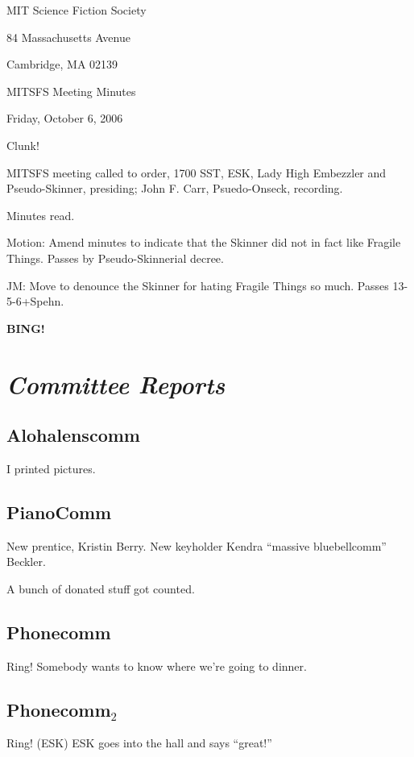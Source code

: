 \documentclass[10pt]{article}
\newcommand{\bing}{{\bf BING!} }
\newcommand{\goto}[1]{\bing \vskip 12pt \section*{{\em{#1}}}}
\begin{document}
\begin{center}

MIT Science Fiction Society

84 Massachusetts Avenue

Cambridge, MA 02139

\vspace{12pt}

MITSFS Meeting Minutes

Friday, October 6, 2006

\end{center}

\vspace{18pt}

\setlength{\parskip}{6pt}

Clunk!

\noindent
MITSFS meeting called to order, 1700 SST,
ESK, Lady High Embezzler and Pseudo-Skinner, presiding;
John F. Carr, Psuedo-Onseck, recording.

Minutes read.

Motion: Amend minutes to indicate that the Skinner did not in fact
like Fragile Things.  Passes by Pseudo-Skinnerial decree.

JM: Move to denounce the Skinner for hating Fragile Things so much.
Passes 13-5-6+Spehn.

\goto{Committee Reports}

\subsection*{Alohalenscomm}

I printed pictures.

\subsection*{PianoComm}

New prentice, Kristin Berry.  New keyholder Kendra ``massive bluebellcomm'' Beckler.

A bunch of donated stuff got counted.

\subsection*{Phonecomm}
Ring!  Somebody wants to know where we're going to dinner.

\subsection*{Phonecomm$_2$}
Ring!  (ESK)  ESK goes into the hall and says ``great!''
\end{document}
